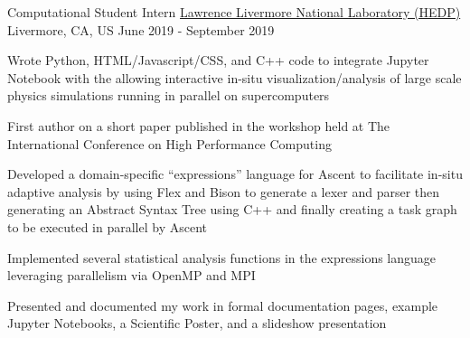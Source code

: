 
\begin{cventries}

  \cventry
    {Computational Student Intern} %
		{\href{https://www.llnl.gov/}{Lawrence Livermore National Laboratory (HEDP)}} %
    {Livermore, CA, US} %
    {June 2019 - September 2019} %
    {
      \begin{cvitems} %
			\item {Wrote Python, HTML/Javascript/CSS, and C++ code to integrate Jupyter Notebook with the  allowing interactive in-situ visualization/analysis of large scale physics simulations running in parallel on supercomputers}
			\item {First author on a short paper published in the  workshop held at The International Conference on High Performance Computing}
				\item {Developed a domain-specific ``expressions'' language for Ascent to facilitate in-situ adaptive analysis by using Flex and Bison to generate a lexer and parser then generating an Abstract Syntax Tree using C++ and finally creating a task graph to be executed in parallel by Ascent}
				\item {Implemented several statistical analysis functions in the expressions language leveraging parallelism via OpenMP and MPI}
				\item{Presented and documented my work in formal documentation pages, example Jupyter Notebooks, a Scientific Poster, and a slideshow presentation}
      \end{cvitems}
    }

\end{cventries}
